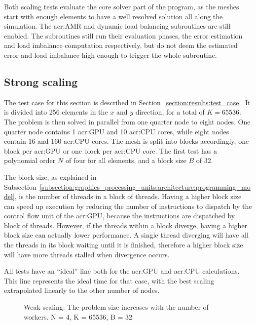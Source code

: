 Both scaling tests evaluate the core solver part of the program, as the meshes start with enough
elements to have a well resolved solution all along the simulation. The \acrlong{acr:AMR} and
dynamic load balancing subroutines are still enabled. The subroutines still run their evaluation
phases, the error estimation and load imbalance computation respectively, but do not deem the
estimated error and load imbalance high enough to trigger the whole subroutine. 

\subsection{Strong scaling}\label{subsection:results:scaling_tests:strong}

The test case for this section is described in Section~\ref{section:results:test_case}. It is
divided into 256 elements in the \(x\) and \(y\) direction, for a total of \(K = 65536\). The
problem is then solved in parallel from one quarter node to eight nodes. One quarter node contains 1
\acrshort{acr:GPU} and 10 \acrshort{acr:CPU} cores, while eight nodes contain 16
 and 160 \acrshort{acr:CPU} cores. The mesh is split into blocks accordingly,
one block per \acrshort{acr:GPU} or one block per \acrshort{acr:CPU} core. The first test has a
polynomial order \(N\) of four for all elements, and a block size \(B\) of 32. 

The block size, as explained in
Subsection~\ref{subsection:graphics_processing_units:architecture:programming_model}, is the number
of threads in a block of threads. Having a higher block size can speed up execution by reducing the
number of instructions to dispatch by the control flow unit of the \acrshort{acr:GPU}, because the
instructions are dispatched by block of threads. However, if the threads within a block diverge,
having a higher block size can actually lower performance. A single thread diverging will have all
the threads in its block waiting until it is finished, therefore a higher block size will have more
threads stalled when divergence occurs.

All tests have an ``ideal'' line both for the \acrshort{acr:GPU} and \acrshort{acr:CPU}
calculations. This line represents the ideal time for that case, with the best scaling extrapolated
linearly to the other number of nodes.

\begin{figure}[H]
	\centering
	
	\caption{Weak scaling: The problem size increases with the number of workers. N = 4, K = 65536, B = 32}\label{fig:strong_scaling_N4_W32}
\end{figure}

